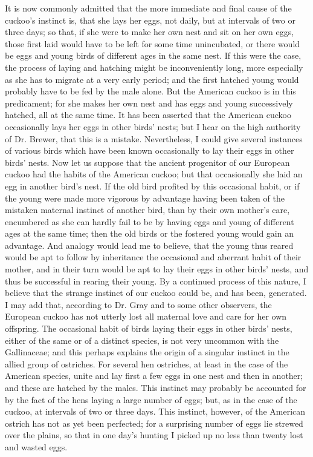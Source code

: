 It is now commonly admitted that the more immediate and final cause of the cuckoo's instinct is, that she lays her eggs, not daily, but at intervals of two or three days; so that, if she were to make her own nest and sit on her own eggs, those first laid would have to be left for some time unincubated, or there would be eggs and young birds of different ages in the same nest. If this were the case, the process of laying and hatching might be inconveniently long, more especially as she has to migrate at a very early period; and the first hatched young would probably have to be fed by the male alone. But the American cuckoo is in this predicament; for she makes her own nest and has eggs and young successively hatched, all at the same time. It has been asserted that the American cuckoo occasionally lays her eggs in other birds' nests; but I hear on the high authority of Dr. Brewer, that this is a mistake. Nevertheless, I could give several instances of various birds which have been known occasionally to lay their eggs in other birds' nests. Now let us suppose that the ancient progenitor of our European cuckoo had the habits of the American cuckoo; but that occasionally she laid an egg in another bird's nest. If the old bird profited by this occasional habit, or if the young were made more vigorous by advantage having been taken of the mistaken maternal instinct of another bird, than by their own mother's care, encumbered as she can hardly fail to be by having eggs and young of different ages at the same time; then the old birds or the fostered young would gain an advantage. And analogy would lead me to believe, that the young thus reared would be apt to follow by inheritance the occasional and aberrant habit of their mother, and in their turn would be apt to lay their eggs in other birds' nests, and thus be successful in rearing their young. By a continued process of this nature, I believe that the strange instinct of our cuckoo could be, and has been, generated. I may add that, according to Dr. Gray and to some other observers, the European cuckoo has not utterly lost all maternal love and care for her own offspring.
The occasional habit of birds laying their eggs in other birds' nests, either of the same or of a distinct species, is not very uncommon with the Gallinaceae; and this perhaps explains the origin of a singular instinct in the allied group of ostriches. For several hen ostriches, at least in the case of the American species, unite and lay first a few eggs in one nest and then in another; and these are hatched by the males. This instinct may probably be accounted for by the fact of the hens laying a large number of eggs; but, as in the case of the cuckoo, at intervals of two or three days. This instinct, however, of the American ostrich has not as yet been perfected; for a surprising number of eggs lie strewed over the plains, so that in one day's hunting I picked up no less than twenty lost and wasted eggs.
